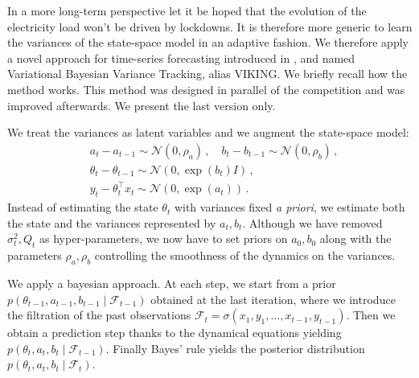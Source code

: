 \documentclass[transmag]{IEEEtran}
\begin{document}
In a more long-term perspective let it be hoped that the evolution of the electricity load won't be driven by lockdowns. It is therefore more generic to learn the variances of the state-space model in an adaptive fashion. We therefore apply a novel approach for time-series forecasting introduced in \cite{tsw}, and named Variational Bayesian Variance Tracking, alias VIKING. We briefly recall how the method works.
This method was designed in parallel of the competition and was improved afterwards. We present the last version only.

We treat the variances as latent variables and we augment the state-space model:
\begin{align*}
	& a_t - a_{t-1} \sim\mathcal{N}(0,\rho_a)\,, \quad
	b_t - b_{t-1} \sim\mathcal{N}(0,\rho_b)\,, \\
	& \theta_t - \theta_{t-1} \sim\mathcal{N}(0, \exp(b_t) I) \,,\\
    & y_t - \theta_t^\top x_t \sim\mathcal{N}(0, \exp(a_t)) \,.
\end{align*}
Instead of estimating the state $\theta_t$ with variances fixed {\it a priori}, we estimate both the state and the variances represented by $a_t,b_t$. Although we have removed $\sigma_t^2,Q_t$ as  hyper-parameters, we now have to set priors on $a_0,b_0$ along with the parameters $\rho_a,\rho_b$ controlling the smoothness of the dynamics on the variances.

We apply a bayesian approach. At each step, we start from a prior $p(\theta_{t-1},a_{t-1},b_{t-1}\mid \mathcal{F}_{t-1})$ obtained at the last iteration, where we introduce the filtration of the past observations $\mathcal{F}_t=\sigma(x_1,y_1,...,x_{t-1},y_{t-1})$. Then we obtain a prediction step thanks to the dynamical equations yielding $p(\theta_t,a_t,b_t\mid \mathcal{F}_{t-1})$. Finally Bayes' rule yields the posterior distribution $p(\theta_t,a_t,b_t\mid \mathcal{F}_t)$.
\end{document}
